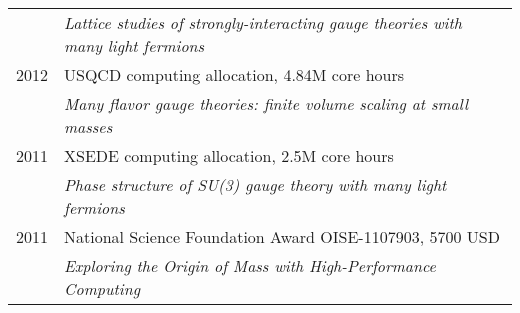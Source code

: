 \begin{spacelist}
\begin{tabular}[t]{cl}
           & \textit{Lattice studies of strongly-interacting gauge theories with many light fermions}                                                                                                                                  \\[6 pt]
      2012 & USQCD computing allocation, 4.84M core hours                                                                                                                                                                              \\ %
           & \textit{Many flavor gauge theories: finite volume scaling at small masses}                                                                                                                                                \\[6 pt]
      2011 & XSEDE computing allocation, 2.5M core hours                                                                                                                                                                               \\ %
           & \textit{Phase structure of SU(3) gauge theory with many light fermions}                                                                                                                                                   \\[6 pt]
      2011 & National Science Foundation Award OISE-1107903, 5700 USD                                                                                                                                                                  \\
           & \textit{Exploring the Origin of Mass with High-Performance Computing}                                                                                                                                                     \\
    \end{tabular}


\end{spacelist}
